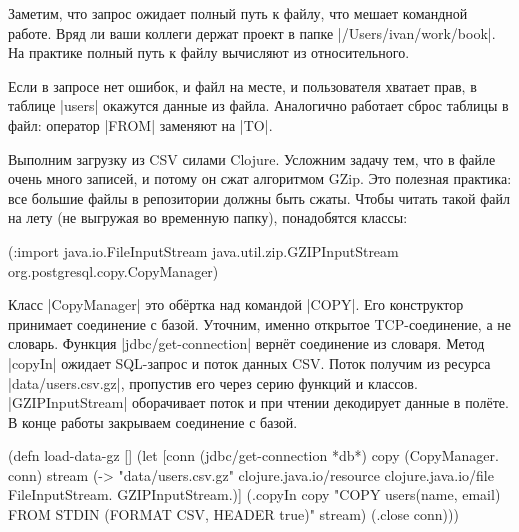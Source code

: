 Заметим, что запрос ожидает полный путь к файлу, что мешает командной
работе. Вряд ли ваши коллеги держат проект в папке
\spverb|/Users/ivan/work/book|. На практике полный путь к файлу вычисляют из
относительного.

Если в запросе нет ошибок, и файл на месте, и пользователя хватает прав, в
таблице \spverb|users| окажутся данные из файла. Аналогично работает сброс
таблицы в файл: оператор \spverb|FROM| заменяют на \spverb|TO|.


Выполним загрузку из CSV силами Clojure. Усложним задачу тем, что в файле очень
много записей, и потому он сжат алгоритмом GZip. Это полезная практика: все
большие файлы в репозитории должны быть сжаты. Чтобы читать такой файл на лету
(не выгружая во временную папку), понадобятся классы:

\begin{english}
  \begin{clojure}
(:import java.io.FileInputStream
         java.util.zip.GZIPInputStream
         org.postgresql.copy.CopyManager)
  \end{clojure}
\end{english}

Класс \spverb|CopyManager| это обёртка над командой \spverb|COPY|. Его
конструктор принимает соединение с базой. Уточним, именно открытое
TCP-соединение, а не словарь. Функция \spverb|jdbc/get-connection| вернёт
соединение из словаря. Метод \spverb|copyIn| ожидает SQL-запрос и поток данных
CSV. Поток получим из ресурса \spverb|data/users.csv.gz|, пропустив его через
серию функций и классов. \spverb|GZIPInputStream| оборачивает поток и при чтении
декодирует данные в полёте. В конце работы закрываем соединение с базой.


\begin{english}
  \begin{clojure}
(defn load-data-gz []
  (let [conn (jdbc/get-connection *db*)
        copy (CopyManager. conn)
        stream (-> "data/users.csv.gz"
                   clojure.java.io/resource
                   clojure.java.io/file
                   FileInputStream.
                   GZIPInputStream.)]
    (.copyIn copy "COPY users(name, email)
                   FROM STDIN (FORMAT CSV, HEADER true)"
             stream)
    (.close conn)))
  \end{clojure}
\end{english}

